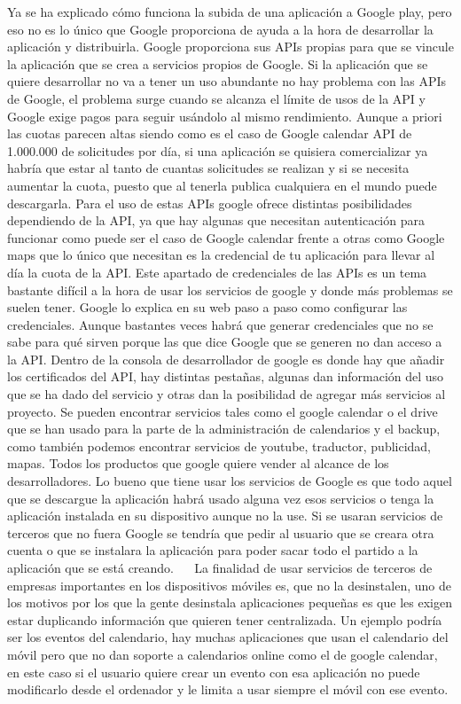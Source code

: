 Ya se ha explicado cómo funciona la subida de una aplicación a Google play, pero eso no es lo único que Google proporciona de ayuda a la hora de desarrollar la aplicación y distribuirla.
Google proporciona sus APIs propias para que se vincule la aplicación que se crea a servicios propios de Google. Si la aplicación que se quiere desarrollar no va a tener un uso abundante no hay problema con las APIs de Google, el problema surge cuando se alcanza el límite de usos de la API y Google exige pagos para seguir usándolo al mismo rendimiento.
Aunque a priori las cuotas parecen altas siendo como es el caso de Google calendar API de 1.000.000 de solicitudes por día, si una aplicación se quisiera comercializar ya habría que estar al tanto de cuantas solicitudes se realizan y si se necesita aumentar la cuota, puesto que al tenerla publica cualquiera en el mundo puede descargarla.
Para el uso de estas APIs google ofrece distintas posibilidades dependiendo de la API, ya que hay algunas que necesitan autenticación para funcionar como puede ser el caso de Google calendar frente a otras como Google maps que lo único que necesitan es la credencial de tu aplicación para llevar al día la cuota de la API.
Este apartado de credenciales de las APIs es un tema bastante difícil a la hora de usar los servicios de google y donde más problemas se suelen tener. Google lo explica en su web paso a paso como configurar las credenciales. Aunque bastantes veces habrá que generar credenciales que no se sabe para qué sirven porque las que dice Google que se generen no dan acceso a la API.
Dentro de la consola de desarrollador de google es donde hay que añadir los certificados del API, hay distintas pestañas, algunas dan información del uso que se ha dado del servicio y otras dan la posibilidad de agregar más servicios al proyecto.
Se pueden encontrar servicios tales como el google calendar o el drive que se han usado para la parte de la administración de calendarios y el backup, como también podemos encontrar servicios de youtube, traductor, publicidad, mapas. Todos los productos que google quiere vender al alcance de los desarrolladores.
Lo bueno que tiene usar los servicios de Google es que todo aquel que se descargue la aplicación habrá usado alguna vez esos servicios o tenga la aplicación instalada en su dispositivo aunque no la use. Si se usaran servicios de terceros que no fuera Google se tendría que pedir al usuario que se creara otra cuenta o que se instalara la aplicación para poder sacar todo el partido a la aplicación que se está creando.
 
La finalidad de usar servicios de terceros de empresas importantes en los dispositivos móviles es, que no la desinstalen, uno de los motivos por los que la gente desinstala aplicaciones pequeñas es que les exigen estar duplicando información que quieren tener centralizada. Un ejemplo podría ser los eventos del calendario, hay muchas aplicaciones que usan el calendario del móvil pero que no dan soporte a calendarios online como el de google calendar, en este caso si el usuario quiere crear un evento con esa aplicación no puede modificarlo desde el ordenador y le limita a usar siempre el móvil con ese evento.
